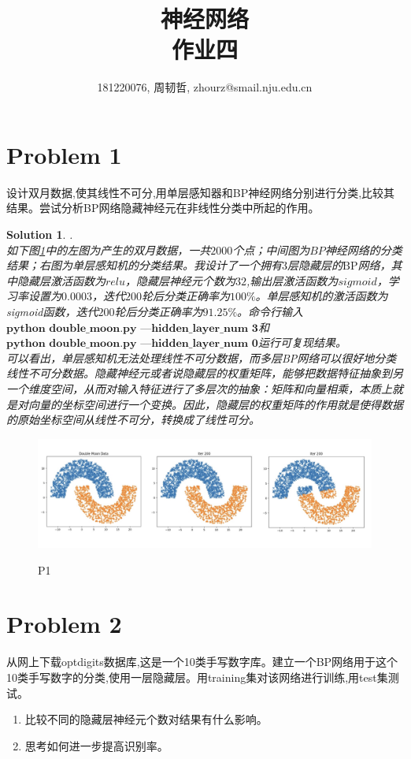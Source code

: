 \documentclass[a4paper,UTF8]{article}
\numberwithin{equation}{section}
\newtheorem*{solution}{Solution}
\begin{document}
\title{神经网络\\
作业四}
\author{181220076, 周韧哲, zhourz@smail.nju.edu.cn}
\maketitle

\section*{Problem 1}
设计双月数据,使其线性不可分,用单层感知器和BP神经网络分别进行分类,比较其结果。尝试分析BP网络隐藏神经元在非线性分类中所起的作用。
\begin{solution}.\\
如下图\ref{fig:1}中的左图为产生的双月数据，一共$2000$个点；中间图为$BP$神经网络的分类结果；右图为单层感知机的分类结果。我设计了一个拥有$3$层隐藏层的$\text{BP}$网络，其中隐藏层激活函数为$relu$，隐藏层神经元个数为$32$,输出层激活函数为$sigmoid$，学习率设置为$0.0003$，迭代$200$轮后分类正确率为$100\%$。单层感知机的激活函数为sigmoid函数，迭代$200$轮后分类正确率为$91.25\%$。命令行输入$\textbf{python double\_moon.py ---hidden\_layer\_num 3}$和$\textbf{python double\_moon.py ---hidden\_layer\_num 0}$运行可复现结果。\\
可以看出，单层感知机无法处理线性不可分数据，而多层BP网络可以很好地分类线性不可分数据。隐藏神经元或者说隐藏层的权重矩阵，能够把数据特征抽象到另一个维度空间，从而对输入特征进行了多层次的抽象：矩阵和向量相乘，本质上就是对向量的坐标空间进行一个变换。因此，隐藏层的权重矩阵的作用就是使得数据的原始坐标空间从线性不可分，转换成了线性可分。
\end{solution}
\begin{figure}[!htb]
	\centering
	\includegraphics[width=\textwidth]{pic/1.png}
	\label{fig:1}
	\caption{P1}
\end{figure}
\section*{Problem 2}
从网上下载optdigits数据库,这是一个10类手写数字库。建立一个BP网络用于这个10类手写数字的分类,使用一层隐藏层。用training集对该网络进行训练,用test集测试。
\begin{enumerate}[(1)]
	\item 比较不同的隐藏层神经元个数对结果有什么影响。
	\item 思考如何进一步提高识别率。
\end{enumerate}
\end{document}
